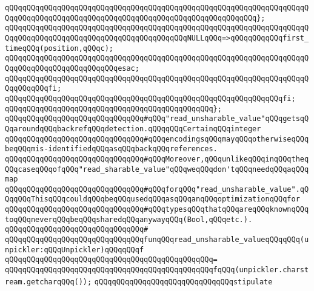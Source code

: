 \verb|qQQqqQQqqQQqqQQqqQQqqQQqqQQqqQQqqQQqqQQqqQQqqQQqqQQqqQQqqQQqqQQqqQQqqQQqqQQqqQQqqQQqqQQqqQQqqQQqqQQqqQQqqQQqqQQqqQQqqQQqqQQqqQQq};|\newline
\newline
\verb|qQQqqQQqqQQqqQQqqQQqqQQqqQQqqQQqqQQqqQQqqQQqqQQqqQQqqQQqqQQqqQQqqQQqqQQqqQQqqQQqqQQqqQQqqQQqqQQqqQQqqQQqqQQqqQQqNULLqQQq=>qQQqqQQqqQQqfirst_timeqQQq(position,qQQqc);|\newline
\verb|qQQqqQQqqQQqqQQqqQQqqQQqqQQqqQQqqQQqqQQqqQQqqQQqqQQqqQQqqQQqqQQqqQQqqQQqqQQqqQQqqQQqqQQqqQQqqQQqesac;|\newline
\verb|qQQqqQQqqQQqqQQqqQQqqQQqqQQqqQQqqQQqqQQqqQQqqQQqqQQqqQQqqQQqqQQqqQQqqQQqqQQqqQQqfi;|\newline
\verb|qQQqqQQqqQQqqQQqqQQqqQQqqQQqqQQqqQQqqQQqqQQqqQQqqQQqqQQqqQQqqQQqfi;|\newline
\verb|qQQqqQQqqQQqqQQqqQQqqQQqqQQqqQQqqQQqqQQqqQQqqQQq};|\newline
\newline
\verb|qQQqqQQqqQQqqQQqqQQqqQQqqQQqqQQq#qQQq"read_unsharable_value"qQQqgetsqQQqaroundqQQqbackrefqQQqdetection.qQQqqQQqCertainqQQqinteger|\newline
\verb|qQQqqQQqqQQqqQQqqQQqqQQqqQQqqQQq#qQQqencodingsqQQqmayqQQqotherwiseqQQqbeqQQqmis-identifiedqQQqasqQQqbackqQQqreferences.|\newline
\verb|qQQqqQQqqQQqqQQqqQQqqQQqqQQqqQQq#qQQqMoreover,qQQqunlikeqQQqinqQQqtheqQQqcaseqQQqofqQQq"read_sharable_value"qQQqweqQQqdon'tqQQqneedqQQqaqQQqmap|\newline
\verb|qQQqqQQqqQQqqQQqqQQqqQQqqQQqqQQq#qQQqforqQQq"read_unsharable_value".qQQqqQQqThisqQQqcouldqQQqbeqQQqusedqQQqasqQQqanqQQqoptimizationqQQqfor|\newline
\verb|qQQqqQQqqQQqqQQqqQQqqQQqqQQqqQQq#qQQqtypesqQQqthatqQQqareqQQqknownqQQqtoqQQqneverqQQqbeqQQqsharedqQQqanywayqQQq(Bool,qQQqetc.).|\newline
\verb|qQQqqQQqqQQqqQQqqQQqqQQqqQQqqQQq#|\newline
\verb|qQQqqQQqqQQqqQQqqQQqqQQqqQQqqQQqfunqQQqread_unsharable_valueqQQqqQQq(unpickler:qQQqUnpickler)qQQqqQQqf|\newline
\verb|qQQqqQQqqQQqqQQqqQQqqQQqqQQqqQQqqQQqqQQqqQQqqQQq=|\newline
\verb|qQQqqQQqqQQqqQQqqQQqqQQqqQQqqQQqqQQqqQQqqQQqqQQqfqQQq(unpickler.charstream.getcharqQQq());|\newline
\newline
\verb|qQQqqQQqqQQqqQQqqQQqqQQqqQQqqQQqstipulate|\newline
